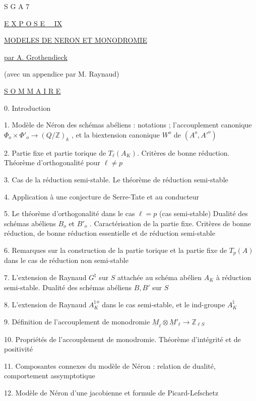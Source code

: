 


S G A 7


\underline{E X P O S E \ \ IX}


\underline{\underline{MODELES DE NERON ET MONODROMIE}}


\underline{par A. Grothendieck}

(avec un appendice par M. Raynaud)


\underline{S O M M A I R E}

0. Introduction

1. Modèle de Néron des schémas abéliens : notations ; l'accouplement canonique $\Phi_o \times \Phi'_o \longrightarrow (Q/\mathbb{Z})_k$ , et la biextension canonique $W^o$ de $(A^o,{A'}^o)$

2. Partie fixe et partie torique de $T_\ell(A_K)$. Critères de bonne réduction. Théorème d'orthogonalité pour $\ell \neq p$

3. Cas de la réduction semi-stable. Le théorème de réduction semi-stable

4. Application à une conjecture de Serre-Tate et au conducteur

5. Le théorème d'orthogonalité dans le cas $\ell = p$ (cas semi-stable) Dualité des schémas abéliens $B_o$ et $B'_o$ . Caractérisation de la partie fixe. Critères de bonne réduction, de bonne réduction essentielle et de réduction semi-stable

6. Remarques sur la construction de la partie torique et la partie fixe de $T_p(A)$ dans le cas de réduction non semi-stable

7. L'extension de Raynaud $G^\natural$ sur $S$ attachée au schéma abélien $A_K$ à réduction semi-stable. Dualité des schémas abéliens $B,B'$ sur $S$

8. L'extension de Raynaud $A_K^{\natural\,o}$ dans le cas semi-stable, et le ind-groupe $A_K^{\natural}$

9. Définition de l'accouplement de monodromie $\underline{M}_\ell \otimes \underline{M}'_\ell \longrightarrow \mathbb{Z}_{\ell S}$

10. Propriétés de l'accouplement de monodromie. Théorème d'intégrité et de positivité

11. Composantes connexes du modèle de Néron : relation de dualité, comportement assymptotique



12. Modèle de Néron d'une jacobienne et formule de Picard-Lefschetz

